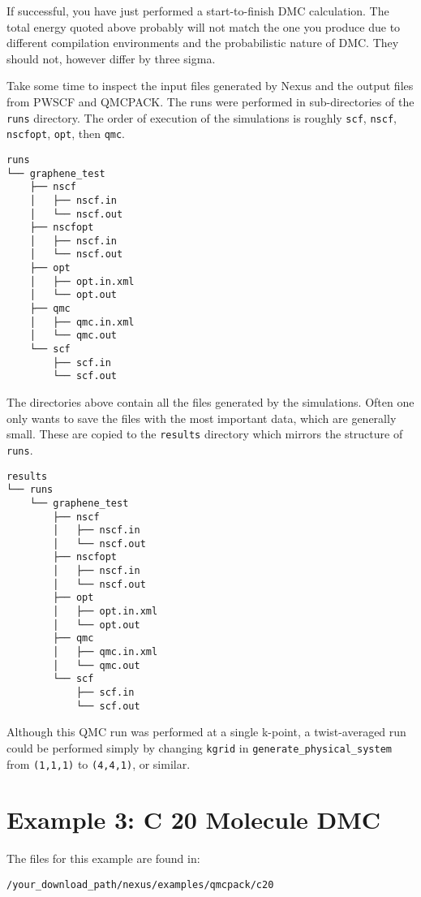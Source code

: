 \documentclass[oneside,11pt]{memoir}
\numberwithin{equation}{section}
\begin{document}
If successful, you have just performed a start-to-finish DMC calculation.  
The total energy quoted above probably will not match the one you produce 
due to different compilation environments and the probabilistic nature of 
DMC.  They should not, however differ by three sigma.

Take some time to inspect the input files generated by Nexus and 
the output files from PWSCF and QMCPACK.  The runs were performed in 
sub-directories of the \texttt{runs} directory.  The order of execution of 
the simulations is roughly \texttt{scf}, \texttt{nscf}, \texttt{nscfopt}, 
\texttt{opt}, then \texttt{qmc}.

\begin{shaded}
\begin{verbatim}
runs
└── graphene_test
    ├── nscf
    │   ├── nscf.in
    │   └── nscf.out
    ├── nscfopt
    │   ├── nscf.in
    │   └── nscf.out
    ├── opt
    │   ├── opt.in.xml
    │   └── opt.out
    ├── qmc
    │   ├── qmc.in.xml
    │   └── qmc.out
    └── scf
        ├── scf.in
        └── scf.out
\end{verbatim}
\end{shaded}

The directories above contain all the files generated by the simulations.  
Often one only wants to save the files with the most important data, which 
are generally small.  These are copied to the \texttt{results} directory 
which mirrors the structure of \texttt{runs}. 

\begin{shaded}
\begin{verbatim}
results
└── runs
    └── graphene_test
        ├── nscf
        │   ├── nscf.in
        │   └── nscf.out
        ├── nscfopt
        │   ├── nscf.in
        │   └── nscf.out
        ├── opt
        │   ├── opt.in.xml
        │   └── opt.out
        ├── qmc
        │   ├── qmc.in.xml
        │   └── qmc.out
        └── scf
            ├── scf.in
            └── scf.out
\end{verbatim}
\end{shaded}

Although this QMC run was performed at a single k-point, a twist-averaged run 
could be performed simply by changing \texttt{kgrid} in 
\texttt{generate\_physical\_system} from \texttt{(1,1,1)} to \texttt{(4,4,1)}, 
or similar.
 





\pagebreak
\section{Example 3: C 20 Molecule DMC}  \label{c20_dmc}
The files for this example are found in:
\begin{shaded}
\begin{verbatim}
/your_download_path/nexus/examples/qmcpack/c20
\end{verbatim}
\end{shaded}
\end{document}
